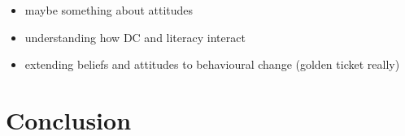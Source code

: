 \documentclass[manuscript,screen,review]{acmart}
\providecommand{\tightlist}{%
  \setlength{\itemsep}{0pt}\setlength{\parskip}{0pt}}\usepackage{longtable,booktabs,array}
\begin{document}
\begin{itemize}
\tightlist
\item
  maybe something about attitudes
\item
  understanding how DC and literacy interact
\item
  extending beliefs and attitudes to behavioural change (golden ticket
  really)
\end{itemize}

\section{Conclusion}\label{conclusion}




\end{document}
